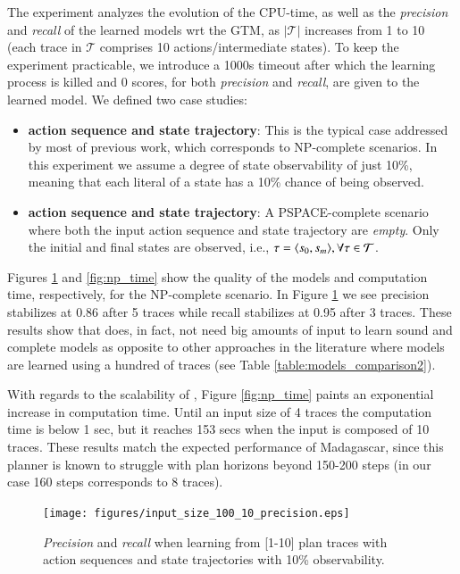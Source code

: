 The experiment analyzes the evolution of the CPU-time, as well as the {\em precision} and {\em recall} of the learned models wrt the GTM, as $|\mathcal{T}|$ increases from 1 to 10 (each trace in $\mathcal{T}$ comprises 10 actions/intermediate states). To keep the experiment practicable, we introduce a 1000s timeout after which the learning process is killed and $0$ scores, for both {\em precision} and {\em recall}, are given to the learned model. We defined two case studies:
\begin{itemize}
	\item \textbf{\FO action sequence and \PO state trajectory}: This is the typical case addressed by most of previous work, which corresponds to NP-complete scenarios. In this experiment we assume a degree of state observability of just 10\%, meaning that each literal of a state has a 10\% chance of being observed.
	\item  \textbf{\NO action sequence and \NO state trajectory}: A PSPACE-complete scenario where both the input action sequence and state trajectory are {\em empty}. Only the initial and final states are observed, i.e., $\tau = {\langle s_0, s_m \rangle}, \forall \tau \in \mathcal{T}$.
\end{itemize}

Figures \ref{fig:np_quality} and \ref{fig:np_time} show the quality of the models and computation time, respectively, for the NP-complete scenario. In Figure \ref{fig:np_quality} we see precision stabilizes at 0.86 after 5 traces while recall stabilizes at 0.95 after 3 traces. These results show that \FAMA does, in fact, not need big amounts of input to learn sound and complete models as opposite to other approaches in the literature where models are learned using a hundred of traces (see Table \ref{table:models_comparison2}).

With regards to the scalability of \FAMA, Figure \ref{fig:np_time} paints an exponential increase in computation time. Until an input size of 4 traces the computation time is below 1 sec, but it reaches 153 secs when the input is composed of 10 traces. These results match the expected performance of {\sc Madagascar}, since this planner is known to struggle with plan horizons beyond 150-200 steps (in our case 160 steps corresponds to 8 traces).

\begin{figure}[hbt!]
	\centering
	\texttt{[image: figures/input\_size\_100\_10\_precision.eps]}
	\caption{{\em Precision} and {\em recall} when learning from [1-10] plan traces with \FO action sequences and \PO state trajectories with 10\% observability.}
	\label{fig:np_quality}
\end{figure}

